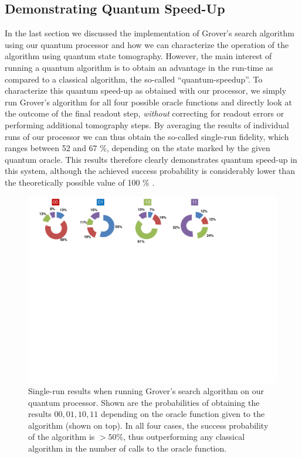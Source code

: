 \subsection{Demonstrating Quantum Speed-Up}

In the last section we discussed the implementation of Grover's search algorithm using our quantum processor and how we can characterize the operation of the algorithm using quantum state tomography. However, the main interest of running a quantum algorithm is to obtain an advantage in the run-time as compared to a classical algorithm, the so-called ``quantum-speedup''. To characterize this quantum speed-up as obtained with our processor, we simply run Grover's algorithm for all four possible oracle functions and directly look at the outcome of the final readout step, \textit{without} correcting for readout errors or performing additional tomography steps. By averaging the results of individual runs of our processor we can thus obtain the so-called single-run fidelity, which ranges between 52 and 67 \%, depending on the state marked by the given quantum oracle. This results therefore clearly demonstrates quantum speed-up in this system, although the achieved success probability is considerably lower than the theoretically possible value of 100 \% .

\begin{figure}[ht!]
		\centering
		\includegraphics[width=1.0\textwidth]{./material/papers/grover/figures/grover_algorithm_single_shot_probabilities}
	\caption[Single run results of Grover's search algorithm implemented on our quantum processor]{Single-run results when running Grover's search algorithm on our quantum processor. Shown are the probabilities of obtaining the results $00,01,10,11$ depending on the oracle function given to the algorithm (shown on top). In all four cases, the success probability of the algorithm is $> 50 \%$, thus outperforming any classical algorithm in the number of calls to the oracle function.}
	\label{fig:GroverSingleShotProbabilities}
\end{figure}

